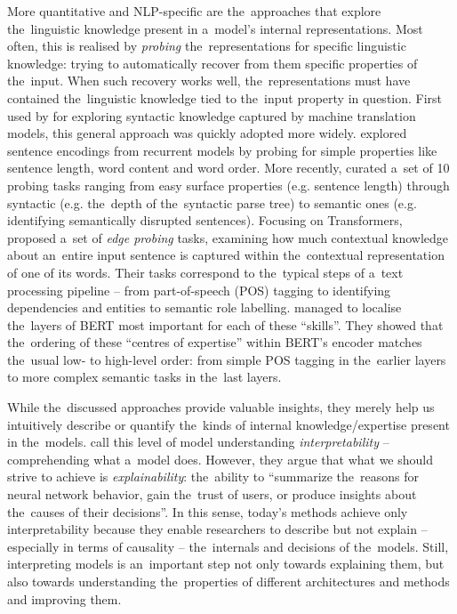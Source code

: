 \documentclass[bsc,frontabs,singlespacing,parskip,deptreport]{infthesis}
\begin{document}
{{    More quantitative and NLP-specific are the~approaches that explore the~linguistic knowledge present in a~model's internal representations.
    Most often, this is realised by \textit{probing} the~representations for specific linguistic knowledge: trying to automatically recover from them specific properties of the~input. When such recovery works well, the~representations must have contained the~linguistic knowledge tied to the~input property in question.
    First used by \citet{Shi_2016} for exploring syntactic knowledge captured by machine translation models, this general approach was quickly adopted more widely.
    \citet{Adi_2017} explored sentence encodings from recurrent models by probing for simple properties like sentence length, word content and word order.
    More recently, \citet{Conneau_2018} curated a~set of 10 probing tasks ranging from easy surface properties (e.g. sentence length) through syntactic (e.g. the~depth of the~syntactic parse tree) to semantic ones (e.g. identifying semantically disrupted sentences).
    Focusing on Transformers, \citet{Tenney_2019a} proposed a~set of \textit{edge probing} tasks, examining how much contextual knowledge about an~entire input sentence is captured within the~contextual representation of one of its words.
    Their tasks correspond to the~typical steps of a~text processing pipeline -- from part-of-speech (POS) tagging to identifying dependencies and entities to semantic role labelling. 
    \citet{Tenney_2019b} managed to localise the~layers of BERT most important for each of these ``skills''. They showed that the~ordering of these ``centres of expertise'' within BERT's encoder matches the~usual low- to high-level order: from simple POS tagging in the~earlier layers to more complex semantic tasks in the~last layers.

    While the~discussed approaches provide valuable insights, they merely help us intuitively describe or quantify the~kinds of internal knowledge/expertise present in the~models. 
    \citet{Gilpin_2018} call this level of model understanding \textit{interpretability} -- comprehending what a~model does. 
    However, they argue that what we should strive to achieve is \textit{explainability}: the~ability to ``summarize the~reasons for neural network behavior, gain the~trust of users, or produce insights about the~causes of their decisions''.
    In this sense, today's methods achieve only interpretability because they enable researchers to describe but not explain -- especially in terms of causality -- the~internals and decisions of the~models.
    Still, interpreting models is an~important step not only towards explaining them, but also towards understanding the~properties of different architectures and methods and improving them.
    
}}
\end{document}
